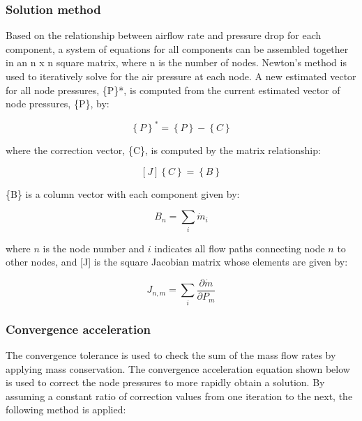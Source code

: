 \subsubsection{Solution method}\label{solution-method}

Based on the relationship between airflow rate and pressure drop for each component, a system of equations for all components can be assembled together in an n x n square matrix, where n is the number of nodes. Newton's method is used to iteratively solve for the air pressure at each node. A new estimated vector for all node pressures, \{P\}*, is computed from the current estimated vector of node pressures, \{P\}, by:

\begin{equation}
{\left\{ P \right\}^*} = \left\{ P \right\} - \left\{ C \right\}
\end{equation}

where the correction vector, \{C\}, is computed by the matrix relationship:

\begin{equation}
\left[ J \right]\left\{ C \right\} = \left\{ B \right\}
\end{equation}

\{B\} is a column vector with each component given by:

\begin{equation}
B_n = \sum_{i} \dot{m}_i
\end{equation}

where $n$ is the node number and $i$ indicates all flow paths connecting node $n$ to other nodes, and [J] is the square Jacobian matrix whose elements are given by:

\begin{equation}
J_{n,m} = \sum_{i} \frac{\partial \dot{m}}{\partial P_m}
\end{equation}

\subsubsection{Convergence acceleration}\label{convergence-acceleration}

The convergence tolerance is used to check the sum of the mass flow rates by applying mass conservation. The convergence acceleration equation shown below is used to correct the node pressures to more rapidly obtain a solution. By assuming a constant ratio of correction values from one iteration to the next, the following method is applied:

